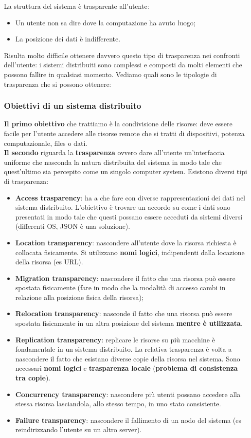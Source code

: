 \documentclass[12pt]{article}
\begin{document}
		La struttura del sistema è trasparente all'utente:
		\begin{itemize}
			\item Un utente non sa dire dove la computazione ha avuto luogo;
			\item La posizione dei dati è indifferente.
		\end{itemize}
		Risulta molto difficile ottenere davvero questo tipo di trasparenza nei confronti dell'utente: i sistemi distribuiti sono complessi e composti da molti elementi che possono fallire in qualsiasi momento. Vediamo quali sono le tipologie di trasparenza che si possono ottenere:
	\subsubsection{Obiettivi di un sistema distribuito}
		\textbf{Il primo obiettivo} che trattiamo è la condivisione delle risorse: deve essere facile per l'utente accedere alle risorse remote che si tratti di dispositivi, potenza computazionale, files o dati.\\
		\textbf{Il secondo} riguarda la \textbf{trasparenza} ovvero dare all'utente un'interfaccia uniforme che nasconda la natura distribuita del sistema in modo tale che quest'ultimo sia percepito come un singolo computer system. Esistono diversi tipi di trasparenza:
		\begin{itemize}
			\item \textbf{Access trasparency}: ha a che fare con diverse rappresentazioni dei dati nel sistema distribuito. L'obiettivo è trovare un accordo su come i dati sono presentati in modo tale che questi possano essere acceduti da sistemi diversi (differenti OS, JSON è una soluzione).
			\item \textbf{Location transparency}: nascondere all'utente dove la risorsa richiesta è collocata fisicamente. Si utilizzano \textbf{nomi logici}, indipendenti dalla locazione della risorsa (es URL).
			\item \textbf{Migration transparency}: nascondere il fatto che una risorsa può essere spostata fisicamente (fare in modo che la modalità di accesso cambi in relazione alla posizione fisica della risorsa);
			\item \textbf{Relocation transparency}: nasconde il fatto che una risorsa può essere spostata fisicamente in un altra posizione del sistema \textbf{mentre è utilizzata}.
			\item \textbf{Replication transparency}: replicare le risorse su più macchine è fondamentale in un sistema distribuito. La relativa trasparenza è volta a nascondere il fatto che esistano diverse copie della risorsa nel sistema. Sono necessari \textbf{nomi logici} e \textbf{trasparenza locale} (\textbf{problema di consistenza tra copie}).
			\item \textbf{Concurrency transparency}: nascondere più utenti possano accedere alla stessa risorsa lasciandola, allo stesso tempo, in uno stato consistente.
			\item \textbf{Failure transparency}: nascondere il fallimento di un nodo del sistema (es reindirizzando l'utente su un altro server).
		\end{itemize}
\end{document}

